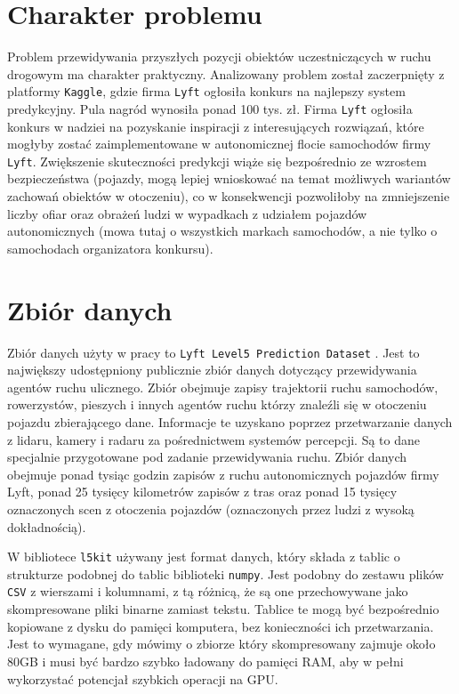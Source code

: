 \section{Charakter problemu}

Problem przewidywania przyszłych pozycji obiektów uczestniczących w ruchu drogowym ma charakter praktyczny. Analizowany problem został zaczerpnięty z platformy \texttt{Kaggle}, gdzie firma \texttt{Lyft} ogłosiła konkurs na najlepszy system predykcyjny. Pula nagród wynosiła ponad 100 tys. zł. Firma \texttt{Lyft} ogłosiła konkurs w nadziei na pozyskanie inspiracji z interesujących rozwiązań, które mogłyby zostać zaimplementowane w autonomicznej flocie samochodów firmy \texttt{Lyft}. Zwiększenie skuteczności predykcji wiąże się bezpośrednio ze wzrostem bezpieczeństwa (pojazdy, mogą lepiej wnioskować na temat możliwych wariantów zachowań obiektów w otoczeniu), co w konsekwencji pozwoliłoby na zmniejszenie liczby ofiar oraz obrażeń ludzi w wypadkach z udziałem pojazdów autonomicznych (mowa tutaj o wszystkich markach samochodów, a nie tylko o samochodach organizatora konkursu).

\newpage

\section{Zbiór danych}

    Zbiór danych użyty w pracy to \texttt{Lyft Level5 Prediction Dataset} \cite{lyft2020}. Jest to największy udostępniony publicznie zbiór danych dotyczący przewidywania agentów ruchu ulicznego. Zbiór obejmuje zapisy trajektorii ruchu samochodów, rowerzystów, pieszych i innych agentów ruchu którzy znaleźli się w otoczeniu pojazdu zbierającego dane. Informacje te uzyskano poprzez przetwarzanie danych z lidaru, kamery i radaru za pośrednictwem systemów percepcji. Są to dane specjalnie przygotowane pod zadanie przewidywania ruchu. Zbiór danych obejmuje ponad tysiąc godzin zapisów z ruchu autonomicznych pojazdów firmy Lyft, ponad 25 tysięcy kilometrów zapisów z tras oraz ponad 15 tysięcy oznaczonych scen z otoczenia pojazdów (oznaczonych przez ludzi z wysoką dokładnością).

\vspace{1em}

W bibliotece \texttt{l5kit} używany jest format danych, który składa z tablic o strukturze podobnej do tablic biblioteki \texttt{numpy}. Jest podobny do zestawu plików \texttt{CSV} z wierszami i kolumnami, z tą różnicą, że są one przechowywane jako skompresowane pliki binarne zamiast tekstu. Tablice te mogą być bezpośrednio kopiowane z dysku do pamięci komputera, bez konieczności ich przetwarzania. Jest to wymagane, gdy mówimy o zbiorze który skompresowany zajmuje około 80GB i musi być bardzo szybko ładowany do pamięci RAM, aby w pełni wykorzystać potencjał szybkich operacji na GPU.

